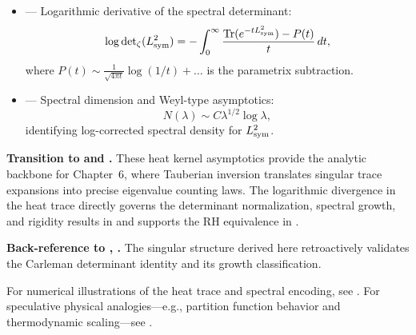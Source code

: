 \begin{itemize}
  \item {} — Logarithmic derivative of the spectral determinant:
  \[
  \log \det\nolimits_{\zeta}(L_{\mathrm{sym}}^2)
  = -\int_0^\infty \frac{\operatorname{Tr}(e^{-t L_{\mathrm{sym}}^2}) - P(t)}{t} \, dt,
  \]
  where \( P(t) \sim \frac{1}{\sqrt{4\pi t}} \log(1/t) + \dots \) is the parametrix subtraction.

  \item {} — Spectral dimension and Weyl-type asymptotics:
  \[
  N(\lambda) \sim C \lambda^{1/2} \log \lambda,
  \]
  identifying log-corrected spectral density for \( L_{\mathrm{sym}}^2 \).
\end{itemize}

\medskip

\noindent\textbf{Transition to  and .}  
These heat kernel asymptotics provide the analytic backbone for Chapter~6, where Tauberian inversion translates singular trace expansions into precise eigenvalue counting laws. The logarithmic divergence in the heat trace directly governs the determinant normalization, spectral growth, and rigidity results in  and supports the RH equivalence in .

\medskip

\noindent\textbf{Back-reference to , .}  
The singular structure derived here retroactively validates the Carleman determinant identity and its growth classification.

\medskip

\noindent
For numerical illustrations of the heat trace and spectral encoding, see . For speculative physical analogies—e.g., partition function behavior and thermodynamic scaling—see .
